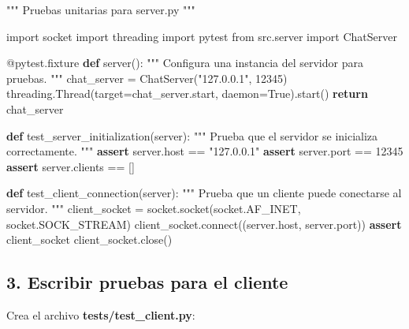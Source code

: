 \documentclass[
  a4paper,
  DIV=11,
  numbers=noendperiod,
  onepage,
  openany]{scrreprt}
\newenvironment{Shaded}{\begin{snugshade}}{\end{snugshade}}
\newcommand{\AttributeTok}[1]{\textcolor[rgb]{0.40,0.45,0.13}{#1}}
\newcommand{\CommentTok}[1]{\textcolor[rgb]{0.37,0.37,0.37}{#1}}
\newcommand{\ControlFlowTok}[1]{\textcolor[rgb]{0.00,0.23,0.31}{\textbf{#1}}}
\newcommand{\DecValTok}[1]{\textcolor[rgb]{0.68,0.00,0.00}{#1}}
\newcommand{\ExtensionTok}[1]{\textcolor[rgb]{0.00,0.23,0.31}{#1}}
\newcommand{\ImportTok}[1]{\textcolor[rgb]{0.00,0.46,0.62}{#1}}
\newcommand{\KeywordTok}[1]{\textcolor[rgb]{0.00,0.23,0.31}{\textbf{#1}}}
\newcommand{\NormalTok}[1]{\textcolor[rgb]{0.00,0.23,0.31}{#1}}
\newcommand{\OperatorTok}[1]{\textcolor[rgb]{0.37,0.37,0.37}{#1}}
\newcommand{\StringTok}[1]{\textcolor[rgb]{0.13,0.47,0.30}{#1}}
\newcommand{\VariableTok}[1]{\textcolor[rgb]{0.07,0.07,0.07}{#1}}
\begin{document}
\begin{Shaded}
\begin{Highlighting}[]
\CommentTok{"""}
\CommentTok{Pruebas unitarias para server.py}
\CommentTok{"""}

\ImportTok{import}\NormalTok{ socket}
\ImportTok{import}\NormalTok{ threading}
\ImportTok{import}\NormalTok{ pytest}
\ImportTok{from}\NormalTok{ src.server }\ImportTok{import}\NormalTok{ ChatServer}


\AttributeTok{@pytest.fixture}
\KeywordTok{def}\NormalTok{ server():}
    \CommentTok{"""}
\CommentTok{    Configura una instancia del servidor para pruebas.}
\CommentTok{    """}
\NormalTok{    chat\_server }\OperatorTok{=}\NormalTok{ ChatServer(}\StringTok{"127.0.0.1"}\NormalTok{, }\DecValTok{12345}\NormalTok{)}
\NormalTok{    threading.Thread(target}\OperatorTok{=}\NormalTok{chat\_server.start, daemon}\OperatorTok{=}\VariableTok{True}\NormalTok{).start()}
    \ControlFlowTok{return}\NormalTok{ chat\_server}


\KeywordTok{def}\NormalTok{ test\_server\_initialization(server):}
    \CommentTok{"""}
\CommentTok{    Prueba que el servidor se inicializa correctamente.}
\CommentTok{    """}
    \ControlFlowTok{assert}\NormalTok{ server.host }\OperatorTok{==} \StringTok{"127.0.0.1"}
    \ControlFlowTok{assert}\NormalTok{ server.port }\OperatorTok{==} \DecValTok{12345}
    \ControlFlowTok{assert}\NormalTok{ server.clients }\OperatorTok{==}\NormalTok{ []}


\KeywordTok{def}\NormalTok{ test\_client\_connection(server):}
    \CommentTok{"""}
\CommentTok{    Prueba que un cliente puede conectarse al servidor.}
\CommentTok{    """}
\NormalTok{    client\_socket }\OperatorTok{=}\NormalTok{ socket.socket(socket.AF\_INET, socket.SOCK\_STREAM)}
\NormalTok{    client\_socket.}\ExtensionTok{connect}\NormalTok{((server.host, server.port))}
    \ControlFlowTok{assert}\NormalTok{ client\_socket}
\NormalTok{    client\_socket.close()}
\end{Highlighting}
\end{Shaded}

\subsection{3. Escribir pruebas para el
cliente}\label{escribir-pruebas-para-el-cliente}

Crea el archivo \textbf{tests/test\_client.py}:
\end{document}
